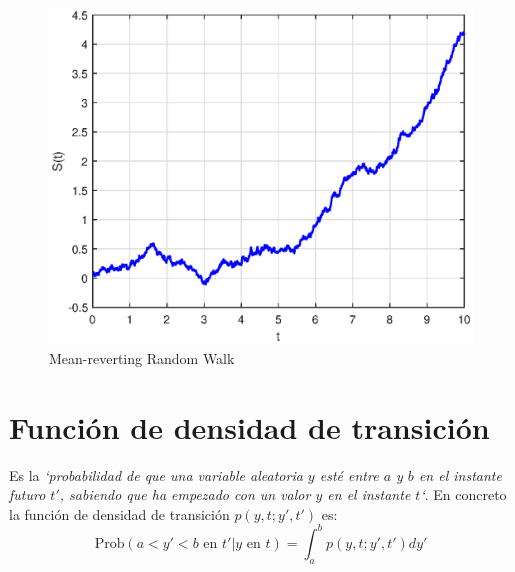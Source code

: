 \begin{itemize}
    \begin{figure}[H]
        \centering
        \includegraphics[width=0.65\linewidth]{Imagenes/Parte1/3_Aleatoriedad/MeanRevertingWalk.eps}
        \caption{Mean-reverting Random Walk}
    \end{figure}
\end{itemize}



\section{Función de densidad de transición}
Es la \textit{`probabilidad de que una variable aleatoria $y$ esté entre $a$ y $b$ en el instante futuro $t'$, sabiendo que ha empezado con un valor $y$ en el instante $t$`}. En concreto la función de densidad de transición $p(y, t; y', t')$ es:
\[
    \boxed{\text{Prob}(a<y'<b\text{ en }t' | y\text{ en }t) = \int_a^b p(y, t; y', t') dy'}
\]

